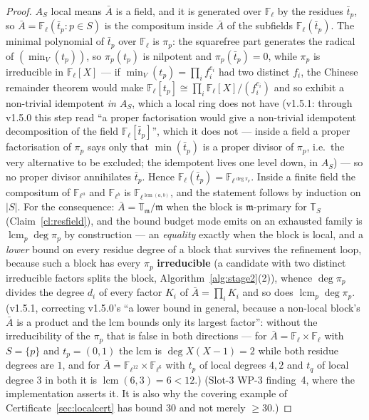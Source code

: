 \documentclass[11pt]{article}
\theoremstyle{remark}
\newcommand{\F}{\mathbb{F}}
\newcommand{\Fl}{\F_\ell}
\newcommand{\T}{\mathbb{T}}
\newcommand{\m}{\mathfrak{m}}
\begin{document}
\begin{proof}
$A_S$ local means $\bar A$ is a field, and it is generated over $\Fl$ by the residues
$\bar t_p$, so $\bar A=\Fl(\bar t_p:p\in S)$ is the compositum inside $\bar A$ of the
subfields $\Fl(\bar t_p)$. The minimal polynomial of $\bar t_p$ over $\Fl$ is $\pi_p$: the
squarefree part generates the radical of $(\min_V(t_p))$, so $\pi_p(t_p)$ is nilpotent and
$\pi_p(\bar t_p)=0$, while $\pi_p$ is irreducible in $\Fl[X]$ --- if
$\min_V(t_p)=\prod_if_i^{e_i}$ had two distinct $f_i$, the Chinese remainder theorem would
make $\Fl[t_p]\cong\prod_i\Fl[X]/(f_i^{e_i})$ and so exhibit a non-trivial idempotent
\emph{in $A_S$}, which a local ring does not have (v1.5.1: through v1.5.0 this step read
``a proper factorisation would give a non-trivial idempotent decomposition of the field
$\Fl[\bar t_p]$'', which it does not --- inside a field a proper factorisation of $\pi_p$
says only that $\min(\bar t_p)$ is a proper divisor of $\pi_p$, i.e.\ the very alternative
to be excluded; the idempotent lives one level down, in $A_S$) --- so no proper divisor
annihilates $\bar t_p$. Hence
$\Fl(\bar t_p)=\F_{\ell^{\deg\pi_p}}$. Inside a finite field the compositum of
$\F_{\ell^{a}}$ and $\F_{\ell^{b}}$ is $\F_{\ell^{\operatorname{lcm}(a,b)}}$, and the
statement follows by induction on $|S|$. For the consequence: $\bar A=\T_\m/\m$ when the
block is $\m$-primary for $\T_S$ (Claim~\ref{cl:resfield}), and the bound budget mode
emits on an exhausted family is $\operatorname{lcm}_p\deg\pi_p$ by construction --- an
\emph{equality} exactly when the block is local, and a \emph{lower} bound on every residue
degree of a block that survives the refinement loop, because such a block has every
$\pi_p$ \textbf{irreducible} (a candidate with two distinct irreducible factors splits the
block, Algorithm~\ref{alg:stage2}(2)), whence $\deg\pi_p$ divides the degree $d_i$ of every
factor $K_i$ of $\bar A=\prod_iK_i$ and so does $\operatorname{lcm}_p\deg\pi_p$.
(v1.5.1, correcting v1.5.0's ``a lower bound in general, because a non-local block's
$\bar A$ is a product and the lcm bounds only its largest factor'': without the
irreducibility of the $\pi_p$ that is false in both directions --- for $\bar A=\Fl\times\Fl$
with $S=\{p\}$ and $t_p=(0,1)$ the lcm is $\deg X(X-1)=2$ while both residue degrees are
$1$, and for $\bar A=\F_{\ell^{12}}\times\F_{\ell^{6}}$ with $t_p$ of local degrees $4,2$
and $t_q$ of local degree $3$ in both it is $\operatorname{lcm}(6,3)=6<12$.)
(Slot-3 WP-3 finding~4, where the implementation asserts it. It is also why
the covering example of Certificate~\ref{sec:localcert} has bound $30$ and not merely
$\ge30$.)
\end{proof}
\end{document}
